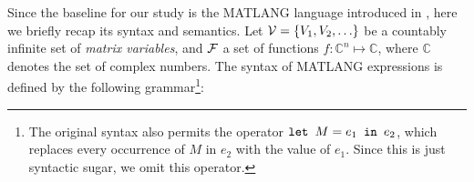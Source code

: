 %
%











Since the baseline for our study is the MATLANG language introduced in \cite{matlang}, here we briefly recap its syntax and semantics. Let $\mathcal{V} = \{V_1, V_2, \ldots\}$ be a countably infinite set of {\em matrix variables}, and $\mathcal{F}$ a set of functions $f:\mathbb{C}^n \mapsto \mathbb{C}$, where $\mathbb{C}$ denotes the set of complex numbers. The syntax of MATLANG expressions is defined by the following grammar\footnote{The original syntax also permits the operator $\texttt{let } M = e_1 \texttt{ in } e_2$, which replaces every occurrence of $M$ in $e_2$ with the value of $e_1$. Since this is just syntactic sugar, we omit this operator.}:

